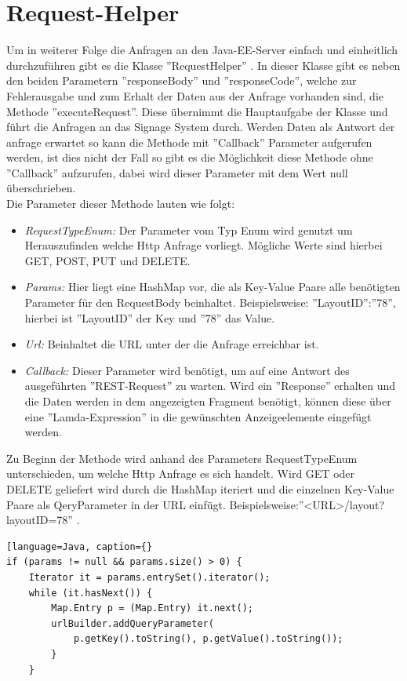 \section{Request-Helper}
Um in weiterer Folge die Anfragen an den Java-EE-Server einfach und einheitlich durchzuführen gibt es die Klasse ''RequestHelper'' . In dieser Klasse gibt es neben den beiden Parametern ''responseBody'' und ''responseCode'', welche zur Fehlerausgabe und zum Erhalt der Daten aus der Anfrage vorhanden sind, die Methode ''executeRequest''. Diese übernimmt die Hauptaufgabe der Klasse und führt die Anfragen an das Signage System durch. Werden Daten als Antwort der anfrage erwartet so kann die Methode mit ''Callback'' Parameter aufgerufen werden, ist dies nicht der Fall so gibt es die Möglichkeit diese Methode ohne ''Callback'' aufzurufen, dabei wird dieser Parameter mit dem Wert null überschrieben.
\\
Die Parameter dieser Methode lauten wie folgt:
\\
\begin{itemize}
	\item {\em RequestTypeEnum:} Der Parameter vom Typ Enum wird genutzt um Herauszufinden welche Http Anfrage vorliegt. Mögliche Werte sind hierbei GET, POST, PUT und DELETE.
	
	\item {\em Params:} Hier liegt eine HashMap vor, die als Key-Value Paare alle benötigten Parameter für den RequestBody beinhaltet. Beispielsweise: ''LayoutID'':''78'', hierbei ist ''LayoutID'' der Key und ''78'' das Value.
		
	\item {\em Url:} Beinhaltet die URL unter der die Anfrage erreichbar ist. 
	
	\item {\em Callback:} Dieser Parameter wird benötigt, um auf eine Antwort des ausgeführten ''REST-Request'' zu warten. Wird ein ''Response'' erhalten und die Daten werden in dem angezeigten Fragment benötigt, können diese über eine ''Lamda-Expression'' in die gewünschten Anzeigeelemente eingefügt werden. 
\end{itemize}
Zu Beginn der Methode wird anhand des Parameters RequestTypeEnum unterschieden, um welche Http Anfrage es sich handelt. Wird GET oder DELETE geliefert wird durch die HashMap iteriert und die einzelnen Key-Value Paare als QeryParameter in der URL einfügt.
Beispielsweise:''<URL>/layout?layoutID=78'' .
\begin{lstlisting}[language=Java, caption={}
if (params != null && params.size() > 0) {
    Iterator it = params.entrySet().iterator();
    while (it.hasNext()) {
     	Map.Entry p = (Map.Entry) it.next();
	    urlBuilder.addQueryParameter(
	      	p.getKey().toString(), p.getValue().toString());
        }
    }
\end{lstlisting}
